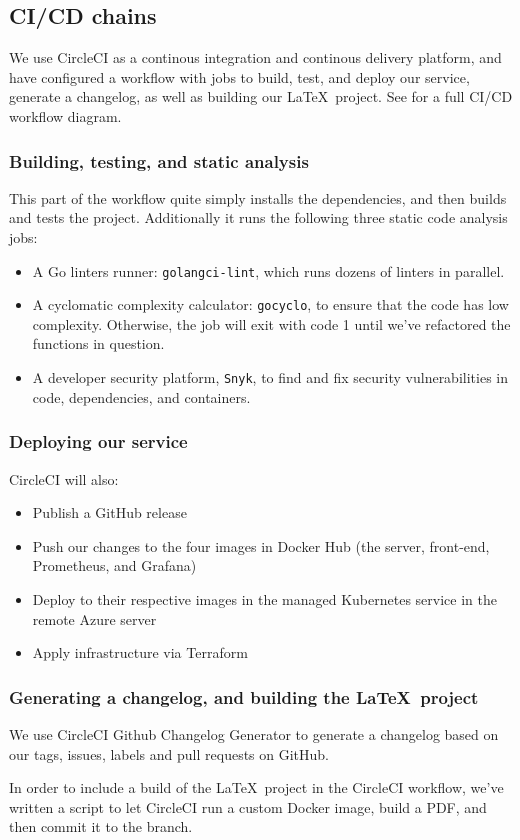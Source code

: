 \subsection{CI/CD chains}

We use CircleCI as a continous integration and continous delivery platform, and have configured a workflow \cite{workflow:circleci} with jobs to build, test, and deploy our service, generate a changelog, as well as building our \LaTeX\ project. See  for a full CI/CD workflow diagram.


\subsubsection{Building, testing, and static analysis}

This part of the workflow quite simply installs the dependencies, and then builds and tests the project. Additionally it runs the following three static code analysis jobs:
\begin{itemize}
    \item A Go linters runner: \texttt{golangci-lint}, which runs dozens of linters in parallel.
    \item A cyclomatic complexity calculator: \texttt{gocyclo}, to ensure that the code has low complexity. Otherwise, the job will exit with code 1 until we've refactored the functions in question.
    \item A developer security platform, \texttt{Snyk}, to find and fix security vulnerabilities in code, dependencies, and containers.
\end{itemize}


\subsubsection{Deploying our service}

CircleCI will also:
\begin{itemize}
    \item Publish a GitHub release
    \item Push our changes to the four images in Docker Hub (the server, front-end, Prometheus, and Grafana)
    \item Deploy to their respective images in the managed Kubernetes service in the remote Azure server
    \item Apply infrastructure via Terraform
\end{itemize}


\subsubsection{Generating a changelog, and building the \LaTeX\ project}

We use CircleCI Github Changelog Generator \cite{tool:changelog-generator} to generate a changelog based on our tags, issues, labels and pull requests on GitHub.

In order to include a build of the \LaTeX\ project in the CircleCI workflow, we've written a script to let CircleCI run a custom Docker image, build a PDF, and then commit it to the branch.
